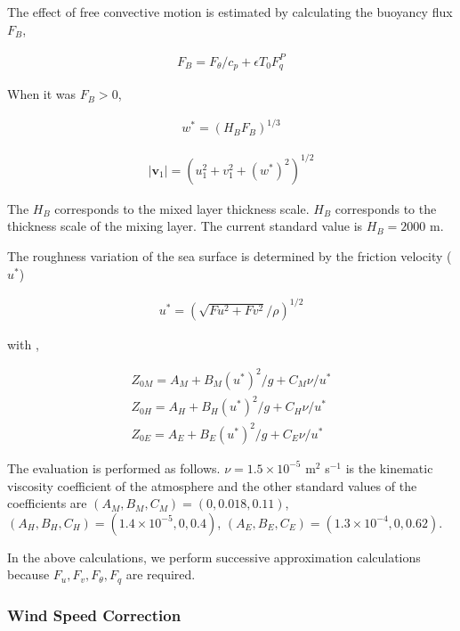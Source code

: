 The effect of free convective motion is estimated by calculating the
buoyancy flux \(F_B\),

\begin{eqnarray}
  F_B = F_\theta/c_p + \epsilon T_0 F_q^P
\end{eqnarray}

When it was \(F_B >0\),

\begin{eqnarray}
  w^* = ( H_{B} F_B )^{1/3}
\end{eqnarray}

\begin{eqnarray}
  |{\mathbf{v}}_1| = \left( u_1^2 + v_1^2 + (w^*)^2 \right)^{1/2}
\end{eqnarray}

The \(H_B\) corresponds to the mixed layer thickness scale. \(H_B\)
corresponds to the thickness scale of the mixing layer. The current
standard value is \(H_B=2000\) m.

The roughness variation of the sea surface is determined by the friction
velocity (\(u^*\))

\begin{eqnarray}
  u^* = \left( \sqrt{Fu^2 + Fv^2}/\rho \right)^{1/2}
\end{eqnarray}

with ,

\begin{eqnarray}
  Z_{0M}  =  A_M + B_M (u^*)^2/g + C_M \nu/u^* \\
  Z_{0H}  =  A_H + B_H (u^*)^2/g + C_H \nu/u^* \\
  Z_{0E}  =  A_E + B_E (u^*)^2/g + C_E \nu/u^*
\end{eqnarray}

The evaluation is performed as follows. \(\nu=1.5\times10^{-5}\) m\(^2\)
s\(^{-1}\) is the kinematic viscosity coefficient of the atmosphere and
the other standard values of the coefficients are
\((A_M, B_M, C_M) = (0, 0.018, 0.11)\),
\((A_H, B_H, C_H) = (1.4\times10^{-5}, 0, 0.4)\),
\((A_E, B_E, C_E) = (1.3\times10^{-4}, 0, 0.62)\).

In the above calculations, we perform successive approximation
calculations because \(F_u, F_v, F_\theta, F_q\) are required.

\hypertarget{wind-speed-correction}{%
\subsubsection{Wind Speed Correction}\label{wind-speed-correction}}

